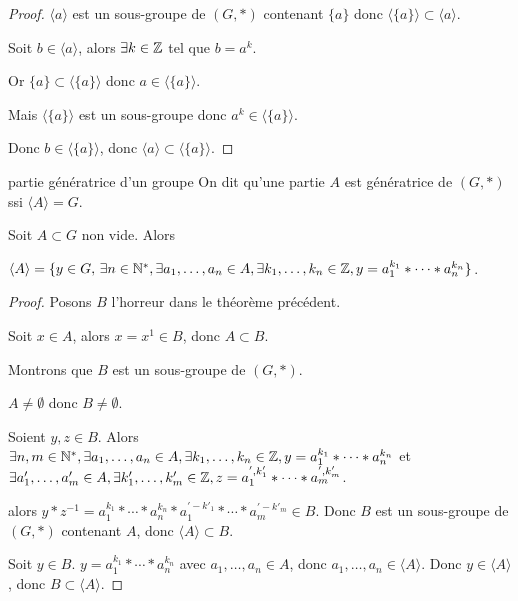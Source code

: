 \begin{proof}
    $\langle a \rangle$ est un sous-groupe de $(G, \ast)$ contenant $\{a\}$ donc $\langle \{a\} \rangle \subset \langle a \rangle$.

    Soit $b \in \langle a \rangle$, alors $\exists k \in \mathbb{Z}$ tel que $b = a^k$.

    Or $\{a\} \subset \langle \{a\} \rangle$ donc $a \in \langle \{a\} \rangle$.

    Mais $\langle \{a\} \rangle$ est un sous-groupe donc $a^k \in \langle \{a\} \rangle$.

    Donc $b \in \langle \{a\} \rangle$, donc $\langle a \rangle \subset \langle \{a\} \rangle$.
\end{proof}

\begin{definition}{partie génératrice d'un groupe}{}
    On dit qu'une partie $A$ est génératrice de $(G, \ast)$ ssi $\langle A \rangle = G$.
\end{definition}

\begin{theoreme}{}{}
    Soit $A \subset G$ non vide. Alors 
    
    $\langle A \rangle = \{y \in G, \, \exists n \in \mathbb{N}^*, \exists a_1, \ldots, a_n \in A, \exists k_1, \ldots, k_n \in \mathbb{Z}, y = a_1^{k_1} \ast \cdots \ast a_n^{k_n}\}$.
\end{theoreme}


\begin{proof}
    Posons $B$ l'horreur dans le théorème précédent. 

    Soit $x \in A$, alors $x = x^1 \in B$, donc $A \subset B$.

    Montrons que $B$ est un sous-groupe de $(G, \ast)$.

    $A \neq \emptyset$ donc $B \neq \emptyset$.

    Soient $y, z \in B$. Alors 
    $\exists n, m \in \mathbb{N}^*, \exists a_1, \ldots, a_n \in A, \exists k_1, \ldots, k_n \in \mathbb{Z}, y = a_1^{k_1} \ast \cdots \ast a_n^{k_n}$
    et $\exists a'_1, \ldots, a'_m \in A, \exists k'_1, \ldots, k'_m \in \mathbb{Z}, z = a_1^{', k'_1} \ast \cdots \ast a_m^{', k'_m}$.

    alors $y \ast z^{-1} = a_1^{k_1} \ast \cdots \ast a_n^{k_n} \ast a_1^{' -k'_1} \ast \cdots \ast a_m^{' -k'_m} \in B$.
    Donc $B$ est un sous-groupe de $(G, \ast)$ contenant $A$, donc $\langle A \rangle \subset B$.

    Soit $y \in B$. 
    $y = a_1^{k_1} \ast \cdots \ast a_n^{k_n}$ avec $a_1, \ldots, a_n \in A$, donc $a_1, \ldots, a_n \in \langle A \rangle$.
    Donc $y \in \langle A \rangle$, donc $B \subset \langle A \rangle$.
\end{proof}

